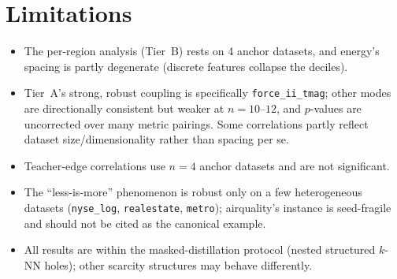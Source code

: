 \section{Limitations}
\label{sec:limitations}

\begin{itemize}
  \item The per-region analysis (Tier~B) rests on 4 anchor datasets, and energy's spacing
    is partly degenerate (discrete features collapse the deciles).
  \item Tier~A's strong, robust coupling is specifically \texttt{force\_ii\_tmag}; other
    modes are directionally consistent but weaker at $n=10$--$12$, and $p$-values are
    uncorrected over many metric pairings. Some correlations partly reflect dataset
    size/dimensionality rather than spacing per se.
  \item Teacher-edge correlations use $n=4$ anchor datasets and are not significant.
  \item The ``less-is-more'' phenomenon is robust only on a few heterogeneous datasets
    (\texttt{nyse\_log}, \texttt{realestate}, \texttt{metro}); airquality's instance is
    seed-fragile and should not be cited as the canonical example.
  \item All results are within the masked-distillation protocol (nested structured $k$-NN
    holes); other scarcity structures may behave differently.
\end{itemize}
